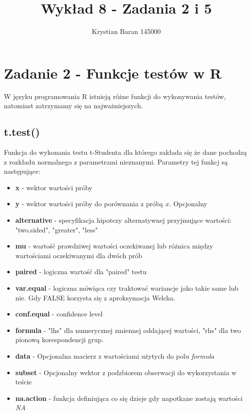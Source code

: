 \documentclass{article}
\author{Krystian Baran 145000}
\title{Wykład 8 - Zadania 2 i 5}
\begin{document}
\maketitle
\newpage

\tableofcontents
\newpage

\section{Zadanie 2 - Funkcje testów w R}

W języku programowania R istnieją różne funkcji do wykonywania testów, natomiast zatrzymamy się na najważniejszych.

\subsection{t.test()}
Funkcja do wykonania testu t-Studenta dla którego zakłada się że dane pochodzą z rozkładu normalnego z parametrami nieznanymi. Parametry tej funkcj są następujące:
\begin{itemize}
\item \textbf{x} - wektor wartości próby
\item \textbf{y} - wektor wartości próby do porównania z próbą $x$. Opcjonalny
\item \textbf{alternative} - specyfikacja hipotezy alternatywnej przyjmujące wartości: "two.sided", "greater", "less"
\item \textbf{mu} - wartość prawdziwej wartości oczekiwanej lub różnica między wartościami oczekiwanymi dla dwóch prób
\item \textbf{paired} - logiczna wartość dla "paired" testu
\item \textbf{var.equal} - logiczna mówiąca czy traktować wariancje jako takie same lub nie. Gdy FALSE korzysta się z aproksymacja Welcha.
\item \textbf{conf.equal} - confidence level
\item \textbf{formula} - "lhs" dla numerycznej zmiennej oddającej wartości, "rhs" dla two pionową korespondencji grup.
\item \textbf{data} - Opcjonalna macierz z wartościami użytych do polu \textit{formula}
\item \textbf{subset}  - Opcjonalny wektor z podzbiorem obserwacji do wykorzystania w teście
\item \textbf{na.action} - funkcja definiująca co się dzieje gdy napotkane zostają wartości \textit{NA}
\end{itemize}
\end{document}
